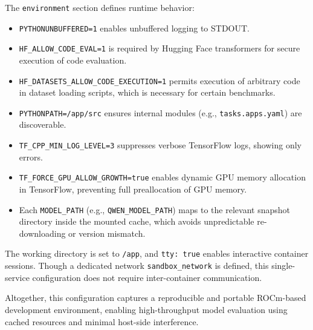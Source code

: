 The \texttt{environment} section defines runtime behavior:
\begin{itemize}
	\item \texttt{PYTHONUNBUFFERED=1} enables unbuffered logging to STDOUT.
	\item \texttt{HF\_ALLOW\_CODE\_EVAL=1} is required by Hugging Face transformers for secure execution of code evaluation.
	\item \texttt{HF\_DATASETS\_ALLOW\_CODE\_EXECUTION=1} permits execution of arbitrary code in dataset loading scripts, which is necessary for certain benchmarks.
	\item \texttt{PYTHONPATH=/app/src} ensures internal modules (e.g., \texttt{tasks.apps.yaml}) are discoverable.
	\item \texttt{TF\_CPP\_MIN\_LOG\_LEVEL=3} suppresses verbose TensorFlow logs, showing only errors.
	\item \texttt{TF\_FORCE\_GPU\_ALLOW\_GROWTH=true} enables dynamic GPU memory allocation in TensorFlow, preventing full preallocation of GPU memory.
	\item Each \texttt{MODEL\_PATH} (e.g., \texttt{QWEN\_MODEL\_PATH}) maps to the relevant snapshot directory inside the mounted cache, which avoids unpredictable re-downloading or version mismatch.
\end{itemize}

The working directory is set to \texttt{/app}, and \texttt{tty: true} enables interactive container sessions. Though a dedicated network \texttt{sandbox\_network} is defined, this single-service configuration does not require inter-container communication.

Altogether, this configuration captures a reproducible and portable ROCm-based development environment, enabling high-throughput model evaluation using cached resources and minimal host-side interference.
